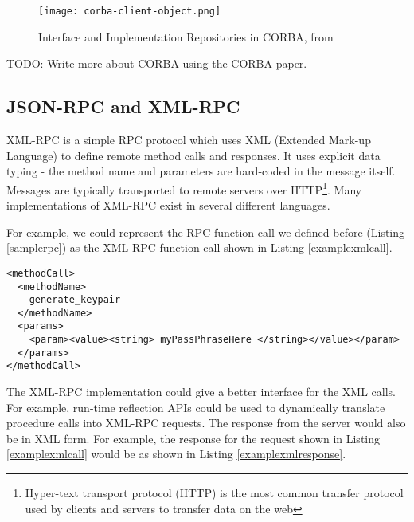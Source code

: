 \begin{figure}
    \centering
    \texttt{[image: corba-client-object.png]}
    \caption{Interface and Implementation Repositories in CORBA, from \cite{isocorba}}
    \label{fig:corba-interfaces}
\end{figure}

TODO: Write more about CORBA using the CORBA paper. \cite{vinoski1997corba}



\subsection{JSON-RPC and XML-RPC} %
\label{sub:json_xml_rpc_intro}
XML-RPC is a simple RPC protocol which uses XML (Extended Mark-up Language) to define remote method calls and responses. It uses explicit data typing - the method name and parameters are hard-coded in the message itself. Messages are typically transported to remote servers over HTTP\footnote{Hyper-text transport protocol (HTTP) is the most common transfer protocol used by clients and servers to transfer data on the web}. Many implementations of XML-RPC exist in several different languages. 

For example, we could represent the RPC function call we defined before (Listing \ref{samplerpc}) as the XML-RPC function call shown in Listing \ref{examplexmlcall}.

\begin{lstlisting}
<methodCall>
  <methodName>
    generate_keypair
  </methodName>
  <params>
    <param><value><string> myPassPhraseHere </string></value></param>
  </params>
</methodCall>
\end{lstlisting}

The XML-RPC implementation could give a better interface for the XML calls. For example, run-time reflection APIs could be used to dynamically translate procedure calls into XML-RPC requests. The response from the server would also be in XML form. For example, the response for the request shown in Listing \ref{examplexmlcall} would be as shown in Listing \ref{examplexmlresponse}.

